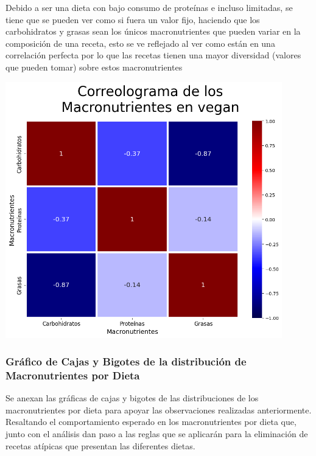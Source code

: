 \documentclass[12pt,a4paper]{article}
\begin{document}
            Debido a ser una dieta con bajo consumo de proteínas e incluso limitadas, se tiene 
            que se pueden ver como si fuera un valor fijo, haciendo que los carbohidratos y 
            grasas sean los únicos macronutrientes que pueden variar en la composición de una 
            receta, esto se ve reflejado al ver como están en una correlación perfecta por lo 
            que las recetas tienen una mayor diversidad (valores que pueden tomar) sobre estos 
            macronutrientes

            \begin{center}
                \includegraphics[width=0.90\textwidth]{Resources/2_03_plot_05_4.png}
            \end{center}

        \subsubsection{Gráfico de Cajas y Bigotes de la distribución de Macronutrientes por Dieta}
            Se anexan las gráficas de cajas y bigotes de las distribuciones de los 
            macronutrientes por dieta para apoyar las observaciones realizadas anteriormente. 
            Resaltando el comportamiento esperado en los macronutrientes por dieta que, junto 
            con el análisis dan paso a las reglas que se aplicarán para la eliminación de recetas 
            atípicas que presentan las diferentes dietas.
\end{document}
